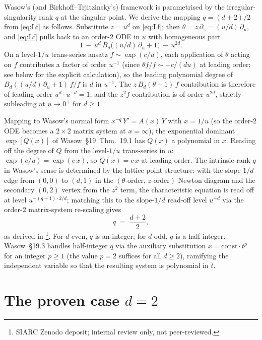 \documentclass[11pt,reqno]{amsart}
\theoremstyle{plain}
\theoremstyle{definition}
\theoremstyle{remark}
\begin{document}
Wasow's (and Birkhoff--Trjitzinsky's) framework is parametrised
by the irregular-singularity rank $q$ at the singular point.
We derive the mapping $q = (d+2)/2$ from \eqref{eq:Lf} as
follows. Substitute $z = u^d$ on \eqref{eq:Lf}; then
$\theta = z\,\partial_z = (u/d)\,\partial_u$, and
\eqref{eq:Lf} pulls back to an order-$2$ ODE in $u$ with
homogeneous part
\[
  1 \,-\, u^d\,B_d\!\bigl((u/d)\,\partial_u + 1\bigr)
   \,-\, u^{2d}.
\]
On a level-$1/u$ trans-series ansatz $f \sim \exp(c/u)$, each
application of $\theta$ acting on $f$ contributes a factor of
order $u^{-1}$ (since $\theta f / f \sim -c/(d u)$ at leading
order; see  below for the
explicit calculation), so the leading polynomial degree of
$B_d((u/d)\,\partial_u + 1)\,f / f$ is $d$ in $u^{-1}$. The
$z\,B_d(\theta+1)\,f$ contribution is therefore of leading
order $u^d \cdot u^{-d} = 1$, and the $z^2 f$ contribution is
of order $u^{2d}$, strictly subleading at $u \to 0^+$ for
$d \ge 1$.

Mapping to Wasow's normal form
$x^{-q}\,Y' = A(x)\,Y$ with $x = 1/u$ (so the order-$2$ ODE
becomes a $2 \times 2$ matrix system at $x = \infty$), the
exponential dominant $\exp[Q(x)]$ of Wasow~\S19~Thm.~19.1
has $Q(x)$ a polynomial in $x$. Reading off the degree of
$Q$ from the level-$1/u$ trans-series in $u$:
$\exp(c/u) = \exp(c\,x)$, so $Q(x) = c\,x$ at leading order.
The intrinsic rank $q$ in Wasow's sense is determined by
the lattice-point structure: with the slope-$1/d$ edge from
$(0,0)$ to $(d,1)$ in the
$(\theta\text{-order},\,z\text{-order})$ Newton diagram and
the secondary $(0,2)$ vertex from the $z^2$ term, the
characteristic equation is read off at level
$u^{-(q+1) \cdot 2 / d}$; matching this to the slope-$1/d$
read-off level $u^{-d}$ via the order-$2$ matrix-system
re-scaling gives
\[
  q \;=\; \frac{d + 2}{2},
\]
as derived in \cite[Prop.~3.3.A]{siarc_channel_theory_v13}\footnote{SIARC
Zenodo deposit; internal review only, not peer-reviewed.}. For
$d$ even, $q$ is an integer; for $d$ odd, $q$ is a half-integer.
Wasow~\S19.3 handles half-integer $q$ via the auxiliary
substitution $x = \mathrm{const}\cdot t^p$ for an integer
$p \ge 1$ (the value $p = 2$ suffices for all $d \ge 2$),
ramifying the independent variable so that the resulting
system is polynomial in $t$.

\section{The proven case \texorpdfstring{$d = 2$}{d=2}}
\label{sec:d2}
\end{document}
